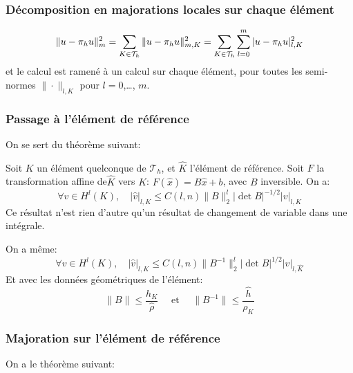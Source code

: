 \medskip
\subsubsection{Décomposition en majorations locales sur chaque élément}

\begin{equation}
\|u-\pi_hu\|^2_m=\displaystyle\sum_{K\in\mathcal{T}_h}\|u-\pi_hu\|^2_{m,K}=\displaystyle\sum_{K\in\mathcal{T}_h}\displaystyle\sum_{l=0}^m |u-\pi_hu|^2_{l,K}
\end{equation}
et le calcul est ramené à un calcul sur chaque élément, pour toutes les semi-normes
$\|\cdot\|_{l,K}$ pour $l=0$,\ldots, $m$.

\medskip
\subsubsection{Passage à l'élément de référence}

On se sert du théorème suivant:

\begin{theoreme}
Soit $K$ un élément quelconque de $\mathcal{T}_h$, et $\hat{K}$ l'élément de
référence. Soit $F$ la transformation affine de$\hat{K}$ vers $K$:
$F(\hat{x}) = B\hat{x} + b$, avec $B$ inversible. On a:
\begin{equation}
\forall v\in H^l(K), \quad
|\hat{v}|_{l,K} \le C(l,n) \|B\|_2^l |\det B|^{-1/2} |v|_{l,K}
\end{equation}
Ce résultat n'est rien d'autre qu'un résultat de changement de variable
dans une intégrale.
\end{theoreme}
On a même:
\begin{equation}
\forall v\in H^l(K), \quad
|\hat{v}|_{l,K} \le C(l,n) \|B^{-1}\|_2^l |\det B|^{1/2} |v|_{l,\hat{K}}
\end{equation}
\medskip
%
Et avec les données géométriques de l'élément:
\begin{equation}
\|B\|\le\dfrac{h_K}{\hat{\rho}} \quad\text{ et }\quad
\|B^{-1}\|\le\dfrac{\hat{h}}{\rho_K}
\end{equation}

\medskip
\subsubsection{Majoration sur l'élément de référence}
On a le théorème suivant:


